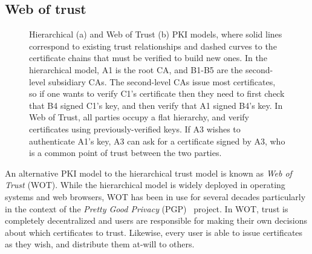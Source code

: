 \documentclass[11pt,twoside]{scrartcl}
\begin{document}
\subsection{Web of trust}

\begin{figure}
\centering
{}
\quad\quad\quad\quad\quad
{}
\caption{Hierarchical (a) and Web of Trust (b) PKI models, where solid lines correspond to existing trust relationships and dashed curves to the certificate chains that must be verified to build new ones. In the hierarchical model, A1 is the root CA, and B1-B5 are the second-level subsidiary CAs. The second-level CAs issue most certificates, so if one wants to verify C1's certificate then they need to first check that B4 signed C1's key, and then verify that A1 signed B4's key. In Web of Trust, all parties occupy a flat hierarchy, and verify certificates using previously-verified keys. If A3 wishes to authenticate A1's key, A3 can ask for a certificate  signed by A3, who is a common point of trust between the two parties. }
\end{figure}

An alternative PKI model to the hierarchical trust model is known as \emph{Web of Trust} (WOT). While the hierarchical model is widely deployed in operating systems and web browsers, WOT has been in use for several decades particularly in the context of the \emph{Pretty Good Privacy} (PGP)~\cite{Garfinkel1996} project. In WOT, trust is completely decentralized and users are responsible for making their own decisions about which certificates to trust. Likewise, every user is able to issue certificates as they wish, and distribute them at-will to others.
\end{document}
